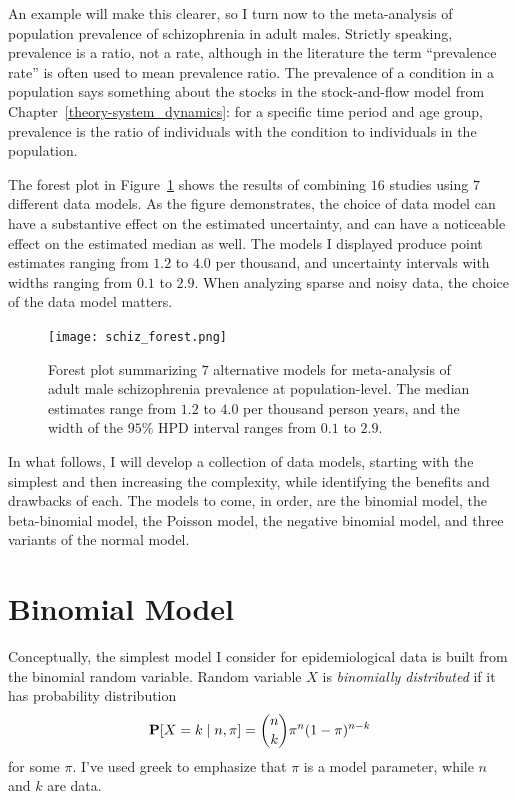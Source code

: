 An example will make this clearer, so I turn now to the meta-analysis
of population prevalence of schizophrenia in adult males.  Strictly
speaking, prevalence is a ratio, not a rate, although in the
literature the term ``prevalence rate'' is often used to mean
prevalence ratio.  The prevalence of a condition in a population says
something about the stocks in the stock-and-flow model from
Chapter~\ref{theory-system_dynamics}: for a specific time period and
age group, prevalence is the ratio of individuals with the condition
to individuals in the population.

The forest plot in Figure~\ref{rate-model-schiz-forest} shows the
results of combining $16$ studies using $7$ different data models.  As
the figure demonstrates, the choice of data model can have a
substantive effect on the estimated uncertainty, and can have a
noticeable effect on the estimated median as well. The models I
displayed produce point estimates ranging from $1.2$ to $4.0$ per
thousand, and uncertainty intervals with widths ranging from $0.1$ to
$2.9$.  When analyzing sparse and noisy data, the choice of the data model
matters.

\begin{figure}[h]
\begin{center}
\texttt{[image: schiz\_forest.png]}
\caption{Forest plot summarizing $7$ alternative models for
  meta-analysis of adult male schizophrenia prevalence at
  population-level.  The median estimates range from
  $1.2$ to
  $4.0$ per thousand person years, and the width of the
  $95\%$ HPD interval ranges from
  $0.1$ to
  $2.9$.}
\label{rate-model-schiz-forest}
\end{center}
\end{figure}

In what follows, I will develop a collection of data models, starting
with the simplest and then increasing the complexity, while
identifying the benefits and drawbacks of each.  The models to come,
in order, are the binomial model, the beta-binomial model, the Poisson
model, the negative binomial model, and three variants of the normal
model.

\section{Binomial Model}
Conceptually, the simplest model I consider for epidemiological data
is built from the binomial random variable. Random variable $X$ is
\emph{binomially distributed} if it has probability distribution
\[
\mathbf{P}[X=k\;|\; n, \pi] = \binom{n}{k}\pi^n(1-\pi)^{n-k}
\]
for some $\pi$.  I've used greek to emphasize that $\pi$ is a model
parameter, while $n$ and $k$ are data.

